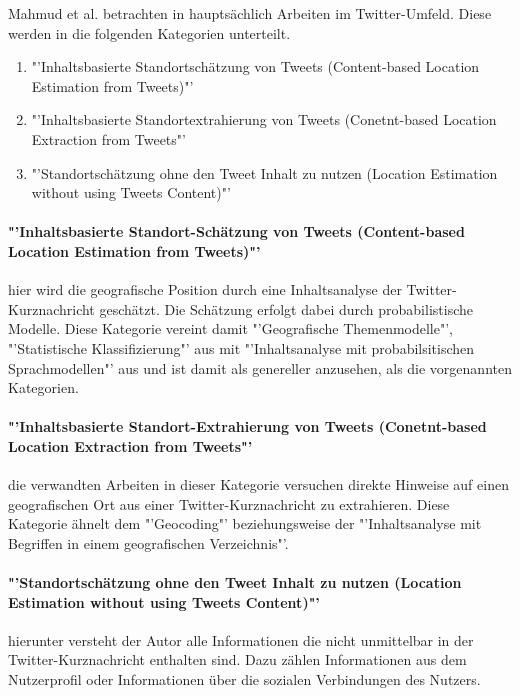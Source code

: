 		Mahmud et al. betrachten in \cite{Mahmud2012} hauptsächlich Arbeiten im Twitter-Umfeld. 
		Diese werden in die folgenden Kategorien unterteilt. 

		\begin{enumerate}
			\item  "'Inhaltsbasierte Standortschätzung von Tweets (Content-based Location Estimation from Tweets)"'
			\item "'Inhaltsbasierte Standortextrahierung von Tweets (Conetnt-based Location Extraction from Tweets"'
			\item "'Standortschätzung ohne den Tweet Inhalt zu nutzen (Location Estimation without using Tweets Content)"'
		\end{enumerate}

		\paragraph*{"'Inhaltsbasierte Standort-Schätzung von Tweets (Content-based Location Estimation from Tweets)"'} hier wird die geografische Position durch eine Inhaltsanalyse der Twitter-Kurznachricht geschätzt. 
		Die Schätzung erfolgt dabei durch probabilistische Modelle.
		Diese Kategorie vereint damit "'Geografische Themenmodelle"', "'Statistische Klassifizierung"' aus \cite{Priedhorsky2013} mit "'Inhaltsanalyse mit probabilsitischen Sprachmodellen"' aus \cite{Cheng2010} und ist damit als genereller anzusehen, als die vorgenannten Kategorien. 

		\paragraph*{"'Inhaltsbasierte Standort-Extrahierung von Tweets (Conetnt-based Location Extraction from Tweets"'} die verwandten Arbeiten in dieser Kategorie versuchen direkte Hinweise auf einen geografischen Ort aus einer Twitter-Kurznachricht zu extrahieren. 
		Diese Kategorie ähnelt dem "'Geocoding"' beziehungsweise der "'Inhaltsanalyse mit Begriffen in einem geografischen Verzeichnis"'. 

		\paragraph*{"'Standortschätzung ohne den Tweet Inhalt zu nutzen (Location Estimation without using Tweets Content)"'} hierunter versteht der Autor alle Informationen die nicht unmittelbar in der Twitter-Kurznachricht enthalten sind. Dazu zählen Informationen aus dem Nutzerprofil oder Informationen über die sozialen Verbindungen des Nutzers.


